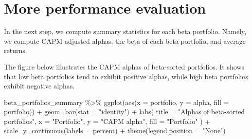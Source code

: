 \documentclass[
]{krantz}
\newenvironment{Shaded}{\begin{snugshade}}{\end{snugshade}}
\newcommand{\AttributeTok}[1]{\textcolor[rgb]{0.61,0.61,0.61}{#1}}
\newcommand{\DecValTok}[1]{\textcolor[rgb]{0.06,0.06,0.06}{#1}}
\newcommand{\FunctionTok}[1]{\textcolor[rgb]{0,0,0}{#1}}
\newcommand{\NormalTok}[1]{#1}
\newcommand{\OtherTok}[1]{\textcolor[rgb]{0.37,0.37,0.37}{#1}}
\newcommand{\SpecialCharTok}[1]{\textcolor[rgb]{0,0,0}{#1}}
\newcommand{\StringTok}[1]{\textcolor[rgb]{0.5,0.5,0.5}{#1}}
\begin{document}
\hypertarget{more-performance-evaluation}{%
\section{More performance evaluation}\label{more-performance-evaluation}}

In the next step, we compute summary statistics for each beta portfolio. Namely, we compute CAPM-adjusted alphas, the beta of each beta portfolio, and average returns.

\begin{Shaded}
\end{Shaded}

The figure below illustrates the CAPM alphas of beta-sorted portfolios. It shows that low beta portfolios tend to exhibit positive alphas, while high beta portfolios exhibit negative alphas.

\begin{Shaded}
\begin{Highlighting}[]
\NormalTok{beta\_portfolios\_summary }\SpecialCharTok{\%\textgreater{}\%}
  \FunctionTok{ggplot}\NormalTok{(}\FunctionTok{aes}\NormalTok{(}\AttributeTok{x =}\NormalTok{ portfolio, }\AttributeTok{y =}\NormalTok{ alpha, }\AttributeTok{fill =}\NormalTok{ portfolio)) }\SpecialCharTok{+}
  \FunctionTok{geom\_bar}\NormalTok{(}\AttributeTok{stat =} \StringTok{"identity"}\NormalTok{) }\SpecialCharTok{+}
  \FunctionTok{labs}\NormalTok{(}
    \AttributeTok{title =} \StringTok{"Alphas of beta{-}sorted portfolios"}\NormalTok{,}
    \AttributeTok{x =} \StringTok{"Portfolio"}\NormalTok{,}
    \AttributeTok{y =} \StringTok{"CAPM alpha"}\NormalTok{,}
    \AttributeTok{fill =} \StringTok{"Portfolio"}
\NormalTok{  ) }\SpecialCharTok{+}
  \FunctionTok{scale\_y\_continuous}\NormalTok{(}\AttributeTok{labels =}\NormalTok{ percent) }\SpecialCharTok{+}
  \FunctionTok{theme}\NormalTok{(}\AttributeTok{legend.position =} \StringTok{"None"}\NormalTok{)}
\end{Highlighting}
\end{Shaded}
\end{document}
